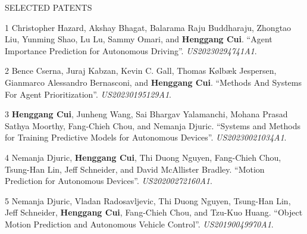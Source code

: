 \documentclass{resume} %
\begin{document}
\begin{rSection}{SELECTED PATENTS}
    \vspace{-.1in}
    \footnotesize{
        \item
        [1]
            Christopher Hazard, Akshay Bhagat, Balarama Raju Buddharaju, Zhongtao Liu, Yunming Shao, Lu Lu, Sammy Omari, and {\bf Henggang Cui}.
            ``Agent Importance Prediction for Autonomous Driving''.
            \emph{US20230294741A1}.
        \item
        [2]
            Bence Cserna, Juraj Kabzan, Kevin C. Gall, Thomas Kølbæk Jespersen, Gianmarco Alessandro Bernasconi, and {\bf Henggang Cui}.
            ``Methods And Systems For Agent Prioritization''.
            \emph{US20230195129A1}.
        \item
        [3]
            {\bf Henggang Cui}, Junheng Wang, Sai Bhargav Yalamanchi, Mohana Prasad Sathya Moorthy, Fang-Chieh Chou, and Nemanja Djuric.
            ``Systems and Methods for Training Predictive Models for Autonomous Devices''.
            \emph{US20230021034A1}.
        \item
        [4]
            Nemanja Djuric, {\bf Henggang Cui}, Thi Duong Nguyen, Fang-Chieh Chou, Tsung-Han Lin, Jeff Schneider, and David McAllister Bradley.
            ``Motion Prediction for Autonomous Devices''.
            \emph{US20200272160A1}.
        \item
        [5]
            Nemanja Djuric, Vladan Radosavljevic, Thi Duong Nguyen, Tsung-Han Lin, Jeff Schneider, {\bf Henggang Cui}, Fang-Chieh Chou, and Tzu-Kuo Huang.
            ``Object Motion Prediction and Autonomous Vehicle Control''.
            \emph{US20190049970A1}.
    }
    \end{rSection}
    \vspace{-.05in}
\end{document}
